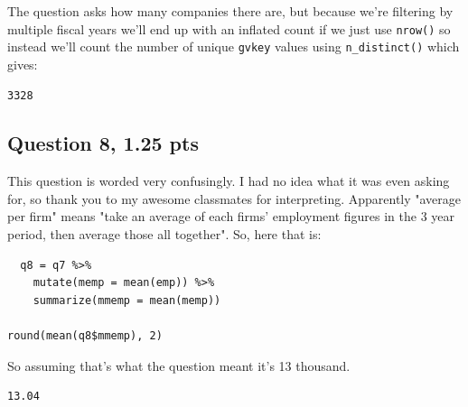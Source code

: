 \documentclass[11pt]{article}
\begin{document}
The question asks how many companies there are, but because we're filtering by multiple fiscal years we'll end up with an inflated count if we just use \texttt{nrow()} so instead we'll count the number of unique \texttt{gvkey} values using \texttt{n\_distinct()} which gives:

\begin{verbatim}
3328
\end{verbatim}


\newpage

\subsection*{Question 8, 1.25 pts}
\label{sec:org40e6f06}
This question is worded very confusingly.  I had no idea what it was even asking for, so thank you to my awesome classmates for interpreting.  Apparently "average per firm" means "take an average of each firms' employment figures in the 3 year period, then average those all together".  So, here that is:

\begin{verbatim}
  q8 = q7 %>%
    mutate(memp = mean(emp)) %>%
    summarize(mmemp = mean(memp))

round(mean(q8$mmemp), 2)
\end{verbatim}

So assuming that's what the question meant it's 13 thousand.

\begin{verbatim}
13.04
\end{verbatim}
\end{document}

